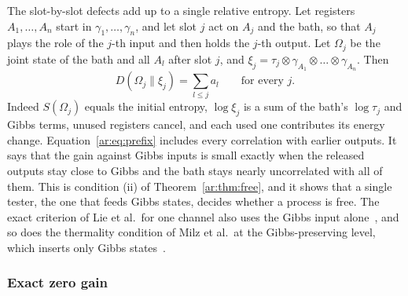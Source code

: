 The slot-by-slot defects add up to a single relative entropy. Let registers $A_1,\dots,A_n$ start in $\gamma_1,\dots,\gamma_n$, and let slot $j$ act on $A_j$ and the bath, so that $A_j$ plays the role of the $j$-th input and then holds the $j$-th output. Let $\Omega_j$ be the joint state of the bath and all $A_l$ after slot $j$, and $\xi_j=\tau_j\otimes\gamma_{A_1}\otimes\dots\otimes\gamma_{A_n}$. Then
\begin{equation}\label{ar:eq:prefix}
D(\Omega_j\|\xi_j)=\sum_{l\le j}a_l\qquad\text{for every }j.
\end{equation}
Indeed $S(\Omega_j)$ equals the initial entropy, $\log\xi_j$ is a sum of the bath's $\log\tau_j$ and Gibbs terms, unused registers cancel, and each used one contributes its energy change. Equation~\eqref{ar:eq:prefix} includes every correlation with earlier outputs. It says that the gain against Gibbs inputs is small exactly when the released outputs stay close to Gibbs and the bath stays nearly uncorrelated with all of them. This is condition (ii) of Theorem~\ref{ar:thm:free}, and it shows that a single tester, the one that feeds Gibbs states, decides whether a process is free. The exact criterion of Lie et al.\ for one channel also uses the Gibbs input alone~\cite{LieEtAl26}, and so does the thermality condition of Milz et al.\ at the Gibbs-preserving level, which inserts only Gibbs states~\cite[Def.~8]{Milz26}.

\subsubsection{Exact zero gain}

